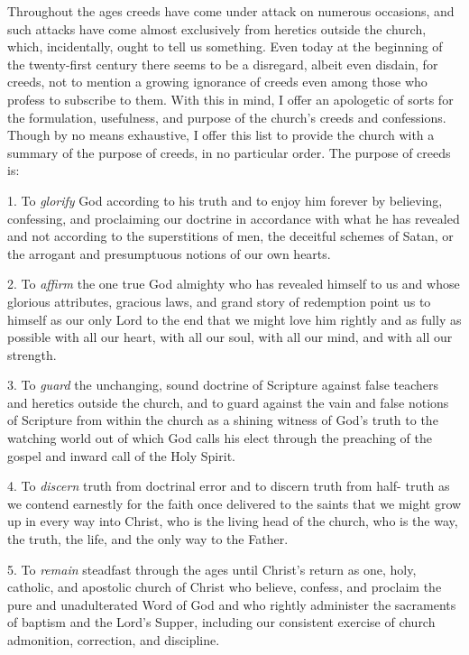 \medskip

Throughout the ages creeds have come under attack on numerous occasions, and such attacks have come almost exclusively from heretics outside the church, which, incidentally, ought to tell us something. Even today at the beginning of the twenty-first century there seems to be a disregard, albeit even disdain, for creeds, not to mention a growing ignorance of creeds even among those who profess to subscribe to them. With this in mind, I offer an apologetic of sorts for the formulation, usefulness, and purpose of the church’s creeds and confessions. Though by no means exhaustive, I offer this list to provide the church with a summary of the purpose of creeds, in no particular order. The purpose of creeds is:

\medskip

1. To \textit{glorify} God according to his truth and to enjoy him forever by believing, confessing, and proclaiming our doctrine in accordance with what he has revealed and not according to the superstitions of men, the deceitful schemes of Satan, or the arrogant and presumptuous notions of our own hearts.

\medskip

2. To \textit{affirm} the one true God almighty who has revealed himself to us and whose glorious attributes, gracious laws, and grand story of redemption point us to himself as our only Lord to the end that we might love him rightly and as fully as possible with all our heart, with all our soul, with all our mind, and with all our strength.

\medskip

3. To \textit{guard} the unchanging, sound doctrine of Scripture against false teachers and heretics outside the church, and to guard against the vain and false notions of Scripture from within the church as a shining witness of God’s truth to the watching world out of which God calls his elect through the preaching of the gospel and inward call of the Holy Spirit.

\medskip

4. To \textit{discern} truth from doctrinal error and to discern truth from half- truth as we contend earnestly for the faith once delivered to the saints that we might grow up in every way into Christ, who is the living head of the church, who is the way, the truth, the life, and the only way to the Father.

\medskip

5. To \textit{remain} steadfast through the ages until Christ’s return as one, holy, catholic, and apostolic church of Christ who believe, confess, and proclaim the pure and unadulterated Word of God and who rightly administer the sacraments of baptism and the Lord’s Supper, including our consistent exercise of church admonition, correction, and discipline.

